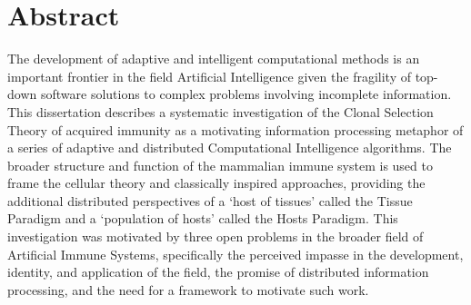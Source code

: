 %
%







\chapter*{Abstract}
The development of adaptive and intelligent computational methods is an important frontier in the field Artificial Intelligence given the fragility of top-down software solutions to complex problems involving incomplete information.
This dissertation describes a systematic investigation of the Clonal Selection Theory of acquired immunity as a motivating information processing metaphor of a series of adaptive and distributed Computational Intelligence algorithms. The broader structure and function of the mammalian immune system is used to frame the cellular theory and classically inspired approaches, providing the additional distributed perspectives of a `host of tissues' called the Tissue Paradigm and a `population of hosts' called the Hosts Paradigm.
This investigation was motivated by three open problems in the broader field of Artificial Immune Systems, specifically the perceived impasse in the development, identity, and application of the field, the promise of distributed information processing, and the need for a framework to motivate such work.

